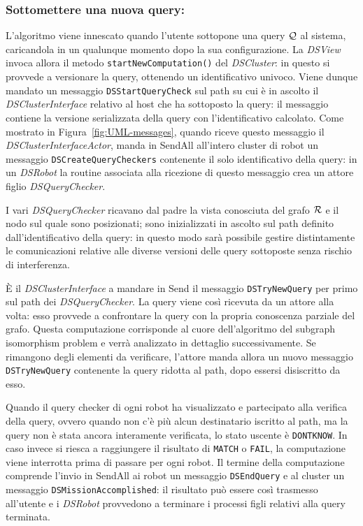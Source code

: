 \subsubsection*{Sottomettere una nuova query:}
L'algoritmo viene innescato quando l'utente sottopone una query $\mathcal{Q}$
al sistema, caricandola in un qualunque momento
dopo la sua configurazione. La \emph{DSView} invoca allora
il metodo \texttt{startNewComputation()} del \emph{DSCluster}:
in questo si provvede a versionare la query,
ottenendo un identificativo univoco.
Viene dunque mandato un messaggio
\texttt{DSStartQueryCheck} sul path su cui è in ascolto
il \emph{DSClusterInterface} relativo al host che ha sottoposto
la query: il messaggio contiene la versione serializzata
della query con l'identificativo calcolato.
Come mostrato in Figura~\ref{fig:UML-messages},
quando riceve questo messaggio il \emph{DSClusterInterfaceActor},
manda in SendAll all'intero cluster di robot un messaggio
\texttt{DSCreateQueryCheckers} contenente il solo identificativo della
query: in un \emph{DSRobot} la routine associata alla ricezione
di questo messaggio crea un attore figlio \emph{DSQueryChecker}.

I vari \emph{DSQueryChecker} ricavano dal padre la vista
conosciuta del grafo $\mathcal{R}$ e il nodo sul quale sono posizionati;
sono inizializzati in ascolto sul path definito dall'identificativo
della query: in questo modo sarà possibile gestire
distintamente le comunicazioni relative alle diverse versioni delle
query sottoposte senza rischio di interferenza.

\`E il \emph{DSClusterInterface} a mandare in Send
il messaggio \texttt{DSTryNewQuery} per primo
sul path dei \emph{DSQueryChecker}.
La query viene così ricevuta da un attore alla volta: esso provvede
a confrontare la query con la propria conoscenza parziale del grafo.
Questa computazione corrisponde al cuore dell'algoritmo del
subgraph isomorphism problem e verrà analizzato in dettaglio
successivamente.
Se rimangono degli elementi da verificare, l'attore manda allora
un nuovo messaggio \texttt{DSTryNewQuery} contenente la query ridotta
al path, dopo essersi disiscritto da esso.

Quando il query checker di ogni robot ha visualizzato e partecipato
alla verifica della query, ovvero quando non c'è più alcun destinatario
iscritto al path, ma la query non è stata ancora interamente verificata,
lo stato uscente è \texttt{DONTKNOW}.
In caso invece si riesca a raggiungere il risultato di \texttt{MATCH}
o \texttt{FAIL}, la computazione viene interrotta prima di passare
per ogni robot. Il termine della computazione comprende l'invio
in SendAll ai robot un messaggio \texttt{DSEndQuery} e al cluster
un messaggio \texttt{DSMissionAccomplished}:
il risultato può essere così trasmesso all'utente e i \emph{DSRobot}
provvedono a terminare i processi figli relativi alla query terminata.

